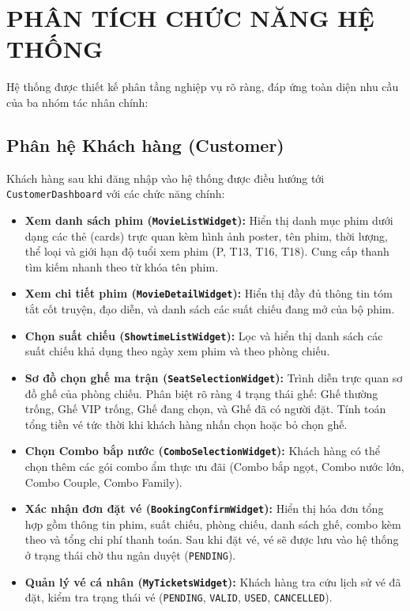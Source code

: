 \documentclass[12pt,a4paper]{article}
\begin{document}
\section{PHÂN TÍCH CHỨC NĂNG HỆ THỐNG}

Hệ thống được thiết kế phân tầng nghiệp vụ rõ ràng, đáp ứng toàn diện nhu cầu của ba nhóm tác nhân chính:

\subsection{Phân hệ Khách hàng (Customer)}
Khách hàng sau khi đăng nhập vào hệ thống được điều hướng tới \texttt{CustomerDashboard} với các chức năng chính:
\begin{itemize}
    \item \textbf{Xem danh sách phim (\texttt{MovieListWidget}):} Hiển thị danh mục phim dưới dạng các thẻ (cards) trực quan kèm hình ảnh poster, tên phim, thời lượng, thể loại và giới hạn độ tuổi xem phim (P, T13, T16, T18). Cung cấp thanh tìm kiếm nhanh theo từ khóa tên phim.
    \item \textbf{Xem chi tiết phim (\texttt{MovieDetailWidget}):} Hiển thị đầy đủ thông tin tóm tắt cốt truyện, đạo diễn, và danh sách các suất chiếu đang mở của bộ phim.
    \item \textbf{Chọn suất chiếu (\texttt{ShowtimeListWidget}):} Lọc và hiển thị danh sách các suất chiếu khả dụng theo ngày xem phim và theo phòng chiếu.
    \item \textbf{Sơ đồ chọn ghế ma trận (\texttt{SeatSelectionWidget}):} Trình diễn trực quan sơ đồ ghế của phòng chiếu. Phân biệt rõ ràng 4 trạng thái ghế: Ghế thường trống, Ghế VIP trống, Ghế đang chọn, và Ghế đã có người đặt. Tính toán tổng tiền vé tức thời khi khách hàng nhấn chọn hoặc bỏ chọn ghế.
    \item \textbf{Chọn Combo bắp nước (\texttt{ComboSelectionWidget}):} Khách hàng có thể chọn thêm các gói combo ẩm thực ưu đãi (Combo bắp ngọt, Combo nước lớn, Combo Couple, Combo Family).
    \item \textbf{Xác nhận đơn đặt vé (\texttt{BookingConfirmWidget}):} Hiển thị hóa đơn tổng hợp gồm thông tin phim, suất chiếu, phòng chiếu, danh sách ghế, combo kèm theo và tổng chi phí thanh toán. Sau khi đặt vé, vé sẽ được lưu vào hệ thống ở trạng thái chờ thu ngân duyệt (\texttt{PENDING}).
    \item \textbf{Quản lý vé cá nhân (\texttt{MyTicketsWidget}):} Khách hàng tra cứu lịch sử vé đã đặt, kiểm tra trạng thái vé (\texttt{PENDING}, \texttt{VALID}, \texttt{USED}, \texttt{CANCELLED}).
\end{itemize}
\end{document}
